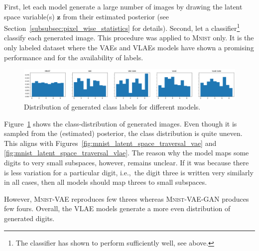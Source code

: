 First, let each model generate a large number of images by drawing the latent space variable(s) $\bm{z}$ from their estimated posterior (see Section~\ref{subsubsec:pixel_wise_statistics} for details).
Second, let a classifier\footnote{The classifier has shown to perform sufficiently well, see above.} classify each generated image.
This procedure was applied to \textsc{Mnist} only.
It is the only labeled dataset where the \acp{VAE} and \acp{VLAE} models have shown a promising performance and for the availability of labels.

\begin{figure}
    \centering
    \includegraphics[width=\textwidth]{images/generated_vs_true/mnist/class_distr.png}
    \caption{Distribution of generated class labels for different models.}
    \label{fig:generated_class_distribution}
\end{figure}

Figure~\ref{fig:generated_class_distribution} shows the class-distribution of generated images.
Even though it is sampled from the (estimated) posterior, the class distribution is quite uneven.
This aligns with Figures~\ref{fig:mnist_latent_space_traversal_vae} and \ref{fig:mnist_latent_space_traversal_vlae}.
The reason why the model maps some digits to very small subspaces, however, remains unclear.
If it was because there is less variation for a particular digit, i.e.,~the digit three is written very similarly in all cases, then all models should map threes to small subspaces.

However, \textsc{Mnist}-\ac{VAE} reproduces few threes whereas \textsc{Mnist}-\ac{VAE}-\ac{GAN} produces few fours.
Overall, the \ac{VLAE} models generate a more even distribution of generated digits.

